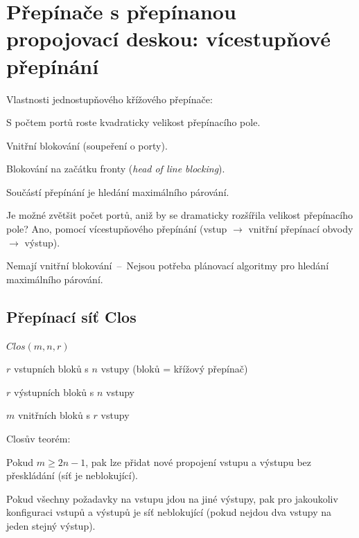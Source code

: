 \section{Přepínače s přepínanou propojovací deskou: vícestupňové přepínání}

Vlastnosti jednostupňového křížového přepínače:
\begin{compactitem}
    \item S počtem portů roste kvadraticky velikost přepínacího pole.
    \item Vnitřní blokování (soupeření o porty).
    \item Blokování na začátku fronty (\textit{head of line blocking}).
    \item Součástí přepínání je hledání maximálního párování.
\end{compactitem}

\noindent Je možné zvětšit počet portů, aniž by se dramaticky rozšířila velikost přepínacího pole? Ano, pomocí vícestupňového přepínání (vstup $\rightarrow$ vnitřní přepínací obvody $\rightarrow$ výstup).
\begin{compactitem}
    \item Nemají vnitřní blokování~--~Nejsou potřeba plánovací algoritmy pro hledání maximálního párování.
\end{compactitem}

\subsection{Přepínací síť Clos}

$Clos(m, n, r)$
\begin{compactitem}
    \item $r$ vstupních bloků s $n$ vstupy (bloků = křížový přepínač)
    \item $r$ výstupních bloků s $n$ vstupy
    \item $m$ vnitřních bloků s $r$ vstupy
\end{compactitem}

\noindent Closův teorém: \begin{compactitem}
    \item Pokud $m \geq 2n - 1$, pak lze přidat nové propojení vstupu a výstupu bez přeskládání (síť je neblokující). \begin{compactitem}
        \item Pokud všechny požadavky na vstupu jdou na jiné výstupy, pak pro jakoukoliv konfiguraci vstupů a výstupů je síť neblokující (pokud nejdou dva vstupy na jeden stejný výstup).
    \end{compactitem}
\end{compactitem}

